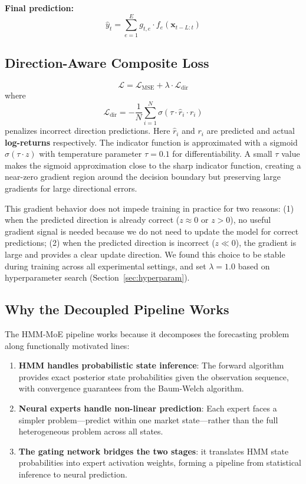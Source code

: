 \documentclass[3p,times]{elsarticle}
\begin{document}
\textbf{Final prediction:}
\begin{equation}
\hat{y}_t = \sum_{e=1}^{E} g_{t,e} \cdot f_e(\mathbf{x}_{t-L:t})
\end{equation}

\subsection{Direction-Aware Composite Loss}
\label{sec:method:loss}

\begin{equation}
\mathcal{L} = \mathcal{L}_{\text{MSE}} + \lambda \cdot \mathcal{L}_{\text{dir}}
\end{equation}
where
\begin{equation}
\mathcal{L}_{\text{dir}} = -\frac{1}{N}\sum_{i=1}^{N} \sigma(\tau \cdot \hat{r}_i \cdot r_i)
\end{equation}
penalizes incorrect direction predictions. Here $\hat{r}_i$ and $r_i$ are predicted and actual \textbf{log-returns} respectively. The indicator function is approximated with a sigmoid $\sigma(\tau \cdot z)$ with temperature parameter $\tau = 0.1$ for differentiability. A small $\tau$ value makes the sigmoid approximation close to the sharp indicator function, creating a near-zero gradient region around the decision boundary but preserving large gradients for large directional errors.

This gradient behavior does not impede training in practice for two reasons: (1) when the predicted direction is already correct ($z \approx 0$ or $z > 0$), no useful gradient signal is needed because we do not need to update the model for correct predictions; (2) when the predicted direction is incorrect ($z \ll 0$), the gradient is large and provides a clear update direction. We found this choice to be stable during training across all experimental settings, and set $\lambda = 1.0$ based on hyperparameter search (Section~\ref{sec:hyperparam}).

\subsection{Why the Decoupled Pipeline Works}

The HMM-MoE pipeline works because it decomposes the forecasting problem along functionally motivated lines:

\begin{enumerate}
\item \textbf{HMM handles probabilistic state inference}: The forward algorithm provides exact posterior state probabilities given the observation sequence, with convergence guarantees from the Baum-Welch algorithm.
\item \textbf{Neural experts handle non-linear prediction}: Each expert faces a simpler problem---predict within one market state---rather than the full heterogeneous problem across all states.
\item \textbf{The gating network bridges the two stages}: it translates HMM state probabilities into expert activation weights, forming a pipeline from statistical inference to neural prediction.
\end{enumerate}
\end{document}
